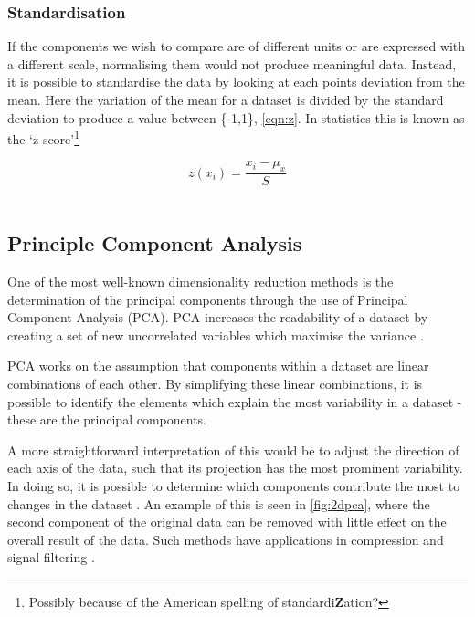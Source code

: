 \subsubsection*{Standardisation}
If the components we wish to compare are of different units or are expressed with a different scale, normalising them would not produce meaningful data. Instead, it is possible to standardise the data by looking at each points deviation from the mean. Here the variation of the mean for a dataset is divided by the standard deviation to produce a value between \{-1,1\}, \autoref{eqn:z}. In statistics this is known as the `z-score'\footnote{Possibly because of the American spelling of standardi\textbf{Z}ation?}

\begin{equation}
    z(x_i) = \frac{x_i - \mu_x}{S}
    \label{eqn:z}
\end{equation}\\    


\subsection{Principle Component Analysis}
One of the most well-known dimensionality reduction methods is the determination of the principal components through the use of Principal Component Analysis (PCA). PCA increases the readability of a dataset by creating a set of new uncorrelated variables which maximise the variance \citep{pcareview}. 


 PCA works on the assumption that components within a dataset are linear combinations of each other. By simplifying these linear combinations, it is possible to identify the elements which explain the most variability in a dataset - these are the principal components. 

A more straightforward interpretation of this would be to adjust the direction of each axis of the data, such that its projection has the most prominent variability. In doing so, it is possible to determine which components contribute the most to changes in the dataset \citep{pca,pca2}. An example of this is seen in \autoref{fig:2dpca}, where the second component of the original data can be removed with little effect on the overall result of the data. Such methods have applications in compression and signal filtering \citep{pcacompress,pcanoise}.


